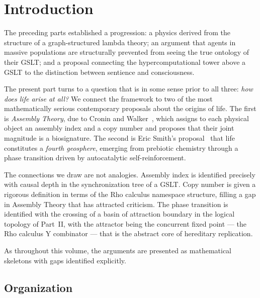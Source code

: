\chapter{Introduction}
\label{sec:origins-intro}

The preceding parts established a progression: a physics derived
from the structure of a graph-structured lambda theory; an argument
that agents in massive populations are structurally prevented from
seeing the true ontology of their GSLT; and a proposal connecting
the hypercomputational tower above a GSLT to the distinction between
sentience and consciousness.

The present part turns to a question that is in some sense prior to
all three: \emph{how does life arise at all?}
We connect the framework to two of the most mathematically serious
contemporary proposals about the origins of life.
The first is \emph{Assembly Theory}, due to Cronin and
Walker~\cite{cronin2023assembly}, which assigns to each physical
object an assembly index and a copy number and proposes that
their joint magnitude is a biosignature.
The second is Eric Smith's proposal~\cite{smith2016origin} that
life constitutes a \emph{fourth geosphere}, emerging from prebiotic
chemistry through a phase transition driven by autocatalytic
self-reinforcement.

The connections we draw are not analogies.
Assembly index is identified precisely with causal depth in the
synchronization tree of a GSLT.
Copy number is given a rigorous definition in terms of the
Rho calculus namespace structure, filling a gap in Assembly
Theory that has attracted criticism.
The phase transition is identified with the crossing of a basin
of attraction boundary in the logical topology of Part~II,
with the attractor being the concurrent fixed point --- the
Rho calculus Y combinator --- that is the abstract core of
hereditary replication.

As throughout this volume, the arguments are presented as
mathematical skeletons with gaps identified explicitly.

\section{Organization}

